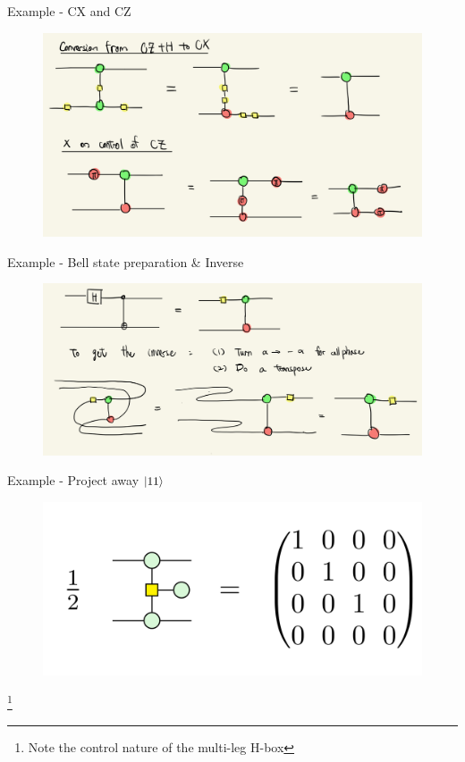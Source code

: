 \documentclass[aspectratio=169,xcolor=dvipsnames, t]{beamer}
\begin{document}
\begin{frame}{Example - CX and CZ}
    \begin{figure}
        \includegraphics[width=.7\textwidth]{figures/zx_cx_cz_identities.PNG}
    \end{figure}
\end{frame}

\begin{frame}{Example - Bell state preparation \& Inverse}
    \begin{figure}
        \includegraphics[width=.8\textwidth]{figures/zx_bell_state_prep.PNG}
    \end{figure}
\end{frame}

\begin{frame}{Example - Project away $\ket{11}$}
    \begin{figure}
        \includegraphics[width=.8\textwidth]{figures/zx_remove_oneone.png}
    \end{figure}
    \footnote{Note the control nature of the multi-leg H-box}
\end{frame}
\end{document}
